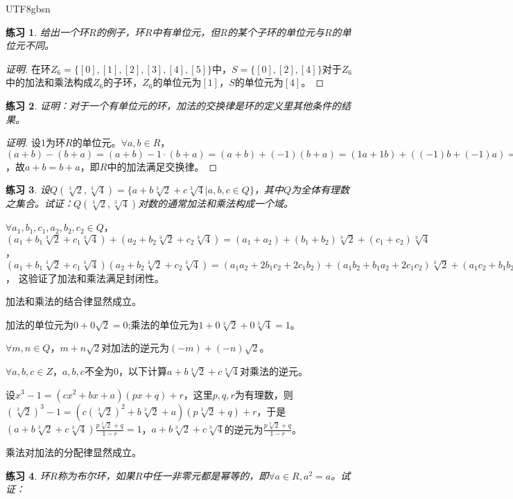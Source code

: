 \documentclass{article}
\newtheorem{Exercise}{练习}
\begin{document}
\begin{CJK*}{UTF8}{gbsn}
\begin{Exercise}
  给出一个环$R$的例子，环$R$中有单位元，但$R$的某个子环的单位元与$R$的单位元不同。
\end{Exercise}
\begin{proof}[证明]
  在环$Z_6=\{[0],[1],[2],[3],[4],[5]\}$中，$S=\{[0],[2],[4]\}$对于$Z_6$中的加法和乘法构成$Z_6$的子环，$Z_6$的单位元为$[1]$，$S$的单位元为$[4]$。
\end{proof}
\begin{Exercise}
证明：对于一个有单位元的环，加法的交换律是环的定义里其他条件的结果。
\end{Exercise}
\begin{proof}[证明]
  设$1$为环$R$的单位元。$\forall a,b\in R$，$(a+b)-(b+a)=(a+b)-1\cdot(b+a)=(a+b)+(-1)(b+a)=(1a+1b)+((-1)b+(-1)a)=1a+(1+(-1))b+(-1)a=1a+0+(-1)a=1a+(-1)a=(1+(-1))a=0a=0$，故$a+b=b+a$，即$R$中的加法满足交换律。
\end{proof}

\begin{Exercise}
  设$Q(\sqrt[3]{2},\sqrt[3]{4})=\{a+b\sqrt[3]{2}+c\sqrt[3]{4}|a,b,c\in Q\}$，其中$Q$为全体有理数之集合。试证：$Q(\sqrt[3]{2},\sqrt[3]{4})$对数的通常加法和乘法构成一个域。  
\end{Exercise}
$\forall a_1,b_1,c_1,a_2,b_2,c_2\in Q$，$(a_1+b_1\sqrt[3]{2}+c_1\sqrt[3]{4})+(a_2+b_2\sqrt[3]{2}+c_2\sqrt[3]{4})=(a_1+a_2)+(b_1+b_2)\sqrt[3]{2}+(c_1+c_2)\sqrt[3]{4}$，$(a_1+b_1\sqrt[3]{2}+c_1\sqrt[3]{4})(a_2+b_2\sqrt[3]{2}+c_2\sqrt[3]{4})=(a_1a_2+2b_1c_2+2c_1b_2)+(a_1b_2+b_1a_2+2c_1c_2)\sqrt[3]{2}+(a_1c_2+b_1b_2+c_1a_2)\sqrt[3]{4}$，
  这验证了加法和乘法满足封闭性。

  加法和乘法的结合律显然成立。

  加法的单位元为$0+0\sqrt{2}=0$;乘法的单位元为$1+0\sqrt[3]{2}+0\sqrt[3]{4}=1$。

  $\forall m,n\in Q$，$m+n\sqrt{2}$对加法的逆元为$(-m)+(-n)\sqrt{2}$。


  $\forall a,b,c\in Z$，$a,b,c$不全为$0$，以下计算$a+b\sqrt[3]{2}+c\sqrt[3]{4}$对乘法的逆元。

  设$x^3-1=(cx^2+bx+a)(px+q)+r$，这里$p,q,r$为有理数，则$(\sqrt[3]{2})^3-1=(c(\sqrt[3]{2})^2+b\sqrt[3]{2}+a)(p\sqrt[3]{2}+q)+r$，于是$(a+b\sqrt[3]{2}+c\sqrt[3]{4})\frac{p\sqrt[3]{2}+q}{1-r}=1$，$a+b\sqrt[3]{2}+c\sqrt[3]{4}$的逆元为$\frac{p\sqrt[3]{2}+q}{1-r}$。

  乘法对加法的分配律显然成立。
\begin{Exercise}
  环$R$称为布尔环，如果$R$中任一非零元都是幂等的，即$\forall a\in R, a^2=a$。试证：


\end{Exercise}
\end{CJK*}
\end{document}
